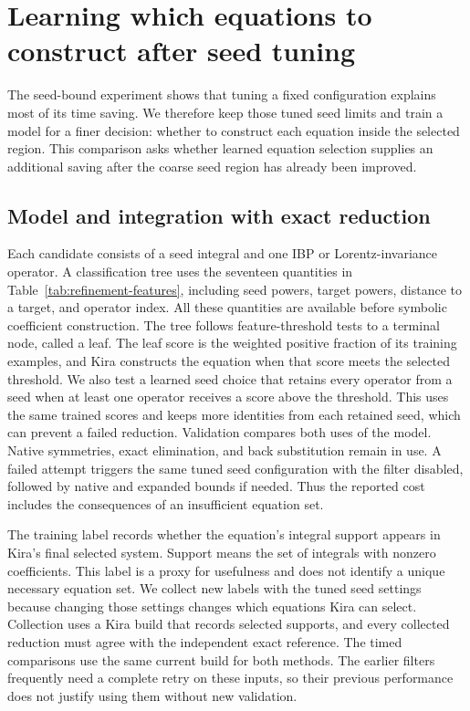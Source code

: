\section{Learning which equations to construct after seed tuning}
\label{sec:equation-refinement}
The seed-bound experiment shows that tuning a fixed configuration explains most of its time saving. We therefore keep those tuned seed limits and train a model for a finer decision: whether to construct each equation inside the selected region. This comparison asks whether learned equation selection supplies an additional saving after the coarse seed region has already been improved.

\subsection{Model and integration with exact reduction}
Each candidate consists of a seed integral and one IBP or Lorentz-invariance operator. A classification tree uses the seventeen quantities in Table~\ref{tab:refinement-features}, including seed powers, target powers, distance to a target, and operator index. All these quantities are available before symbolic coefficient construction. The tree follows feature-threshold tests to a terminal node, called a leaf. The leaf score is the weighted positive fraction of its training examples, and Kira constructs the equation when that score meets the selected threshold. We also test a learned seed choice that retains every operator from a seed when at least one operator receives a score above the threshold. This uses the same trained scores and keeps more identities from each retained seed, which can prevent a failed reduction. Validation compares both uses of the model. Native symmetries, exact elimination, and back substitution remain in use. A failed attempt triggers the same tuned seed configuration with the filter disabled, followed by native and expanded bounds if needed. Thus the reported cost includes the consequences of an insufficient equation set.

The training label records whether the equation's integral support appears in Kira's final selected system. Support means the set of integrals with nonzero coefficients. This label is a proxy for usefulness and does not identify a unique necessary equation set. We collect new labels with the tuned seed settings because changing those settings changes which equations Kira can select. Collection uses a Kira build that records selected supports, and every collected reduction must agree with the independent exact reference. The timed comparisons use the same current build for both methods. The earlier filters frequently need a complete retry on these inputs, so their previous performance does not justify using them without new validation.

